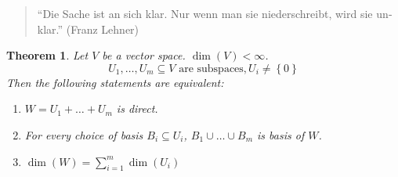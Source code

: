 \documentclass[a4paper,landscape,twocolumn]{article}
\newcommand\set[1]{\left\{#1\right\}}
\newtheorem{theorem}{Theorem}
\begin{document}
\begin{quote}
  \foreignlanguage{ngerman}{\enquote{Die Sache ist an sich klar. Nur wenn man sie niederschreibt, wird sie unklar.} (Franz Lehner)}
\end{quote}

\begin{theorem}
  \label{satz-4-15}
  Let $V$ be a vector space. $\dim(V) < \infty$.
  \[ U_1, \dots, U_m \subseteq V \text{ are subspaces}, U_i \neq \set{0} \]
  Then the following statements are equivalent:
  \begin{enumerate}
    \item $W = U_1 + \dots + U_m$ is direct.
    \item For every choice of basis $B_i \subseteq U_i$, $B_1 \cup \dots \cup B_m$ is basis of $W$.
    \item $\dim(W) = \sum_{i=1}^m \dim(U_i)$
  \end{enumerate}
\end{theorem}
\end{document}
